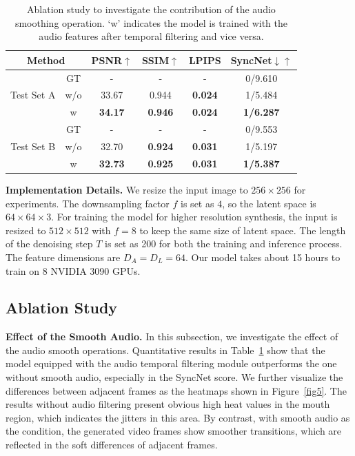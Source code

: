 \documentclass[10pt,twocolumn,letterpaper]{article}
\begin{document}
\begin{table}[tb]
\begin{center}
\centering
\renewcommand\tabcolsep{3.8pt}
\begin{tabular}{c |c|c c c c} 
\toprule
 \multicolumn{2}{c|}{Method}&PSNR$\uparrow$ &SSIM$\uparrow$ & LPIPS  & SyncNet$\downarrow\uparrow$  \\
\midrule
\multirow{3}{*}{Test Set A}&GT&-&-&-&0/9.610\\
&w/o& 33.67&0.944 &\bf{0.024} &1/5.484\\
&w&\bf{34.17}&\bf{0.946}&\bf{0.024}&\bf{1/6.287}\\
\midrule
\multirow{3}{*}{Test Set B}&GT&-&-&-&0/9.553\\
&w/o & 32.70&\bf{0.924}&\bf{0.031}&1/5.197 \\
&w&\bf{32.73}&\bf{0.925}&\bf{0.031}&\bf{1/5.387}\\
\bottomrule
\end{tabular}
\end{center}
\vspace{-5mm}
\caption{Ablation study to investigate the contribution of the audio smoothing operation. ‘w’ indicates the model is trained with the audio features after temporal filtering and vice versa.}
\vspace{-3mm}
\label{table1}
\end{table}

\textbf{Implementation Details.}
We resize the input image to $256\times 256$ for experiments. The downsampling factor $f$ is set as $4$, so the latent space is $64\times 64 \times 3$. For training the model for higher resolution synthesis, the input is resized to $512\times 512$ with $f=8$ to keep the same size of latent space.
The length of the denoising step $T$ is set as 200 for both the training and inference process. The feature dimensions are $D_A=D_L=64$.
Our model takes about 15 hours to train on 8 NVIDIA 3090 GPUs. 


\subsection{Ablation Study}

\textbf{Effect of the Smooth Audio.} In this subsection, we investigate the effect of the audio smooth operations. Quantitative results in Table~\ref{table1} show that the model equipped with the audio temporal filtering module outperforms the one without smooth audio, especially in the SyncNet score. We further visualize the differences between adjacent frames as the heatmaps shown in Figure~\ref{fig5}. The results without audio filtering present obvious high heat values in the mouth region, which indicates the jitters in this area. By contrast, with smooth audio as the condition, the generated video frames show smoother transitions, which are reflected in the soft differences of adjacent frames.
\end{document}
